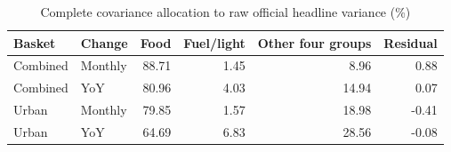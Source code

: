 \begin{table}[htbp]
\centering\small
\caption{Complete covariance allocation to raw official headline variance (\%)}
\begin{tabular}{llrrrr}
\toprule
Basket &Change&Food&Fuel/light&Other four groups&Residual\\
\midrule
Combined & Monthly & 88.71 & 1.45 & 8.96 & 0.88\\
Combined & YoY & 80.96 & 4.03 & 14.94 & 0.07\\
Urban & Monthly & 79.85 & 1.57 & 18.98 & -0.41\\
Urban & YoY & 64.69 & 6.83 & 28.56 & -0.08\\
\bottomrule
\end{tabular}
\end{table}
